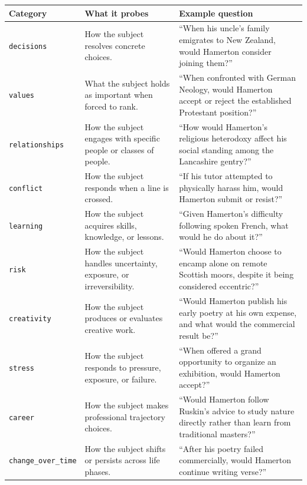 \begin{longtable}[]{@{}
  >{\raggedright\arraybackslash}p{}
  >{\raggedright\arraybackslash}p{}
  >{\raggedright\arraybackslash}p{}@{}}
\toprule
Category & What it probes & Example question \\
\midrule
\endhead
\texttt{decisions} & How the subject resolves concrete choices. & ``When
his uncle's family emigrates to New Zealand, would Hamerton consider
joining them?'' \\
\texttt{values} & What the subject holds as important when forced to
rank. & ``When confronted with German Neology, would Hamerton accept or
reject the established Protestant position?'' \\
\texttt{relationships} & How the subject engages with specific people or
classes of people. & ``How would Hamerton's religious heterodoxy affect
his social standing among the Lancashire gentry?'' \\
\texttt{conflict} & How the subject responds when a line is crossed. &
``If his tutor attempted to physically harass him, would Hamerton submit
or resist?'' \\
\texttt{learning} & How the subject acquires skills, knowledge, or
lessons. & ``Given Hamerton's difficulty following spoken French, what
would he do about it?'' \\
\texttt{risk} & How the subject handles uncertainty, exposure, or
irreversibility. & ``Would Hamerton choose to encamp alone on remote
Scottish moors, despite it being considered eccentric?'' \\
\texttt{creativity} & How the subject produces or evaluates creative
work. & ``Would Hamerton publish his early poetry at his own expense,
and what would the commercial result be?'' \\
\texttt{stress} & How the subject responds to pressure, exposure, or
failure. & ``When offered a grand opportunity to organize an exhibition,
would Hamerton accept?'' \\
\texttt{career} & How the subject makes professional trajectory choices.
& ``Would Hamerton follow Ruskin's advice to study nature directly
rather than learn from traditional masters?'' \\
\texttt{change\_over\_time} & How the subject shifts or persists across
life phases. & ``After his poetry failed commercially, would Hamerton
continue writing verse?'' \\
\bottomrule
\end{longtable}

